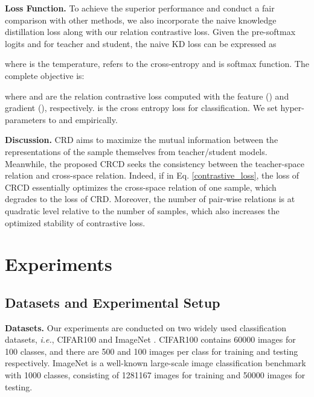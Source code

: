 \documentclass[final]{cvpr}
\begin{document}
\noindent \textbf{Loss Function.}  To achieve the superior performance and conduct a fair comparison with other methods, we also incorporate the naive knowledge distillation loss  \cite{hinton2015distilling} along with our relation contrastive loss. 
Given the pre-softmax logits  and  for teacher and student, the naive KD loss can be expressed as

where  is the temperature,  refers to the cross-entropy and  is  softmax function. 
The complete objective is:

where  and  are the relation contrastive loss computed with the feature () and gradient (), respectively.  is the cross entropy loss for classification. We set hyper-parameters to  and  empirically.  

\noindent \textbf{Discussion.}  CRD \cite{crd} aims to maximize the mutual information between the representations of the sample themselves from teacher/student models. Meanwhile, the proposed CRCD seeks the consistency between the teacher-space relation and cross-space relation. Indeed, if  in Eq. \ref{contrastive_loss}, the loss of CRCD essentially optimizes the cross-space relation of one sample, which degrades to the loss of CRD. Moreover, the number of pair-wise relations is at quadratic level relative to the number of samples, which also increases the optimized stability of  contrastive  loss. 

\section{Experiments}

\subsection{Datasets and Experimental Setup}


\noindent \textbf{Datasets.} Our experiments are conducted on two widely used classification datasets, \emph{i.e.}, CIFAR100 \cite{cifar100} and ImageNet \cite{imagenet}. CIFAR100 contains 60000 images for 100 classes, and there are 500 and 100 images per class for training and testing respectively. ImageNet is a well-known large-scale image classification benchmark with 1000 classes, consisting of 1281167 images for training and 50000 images for testing.
\end{document}
